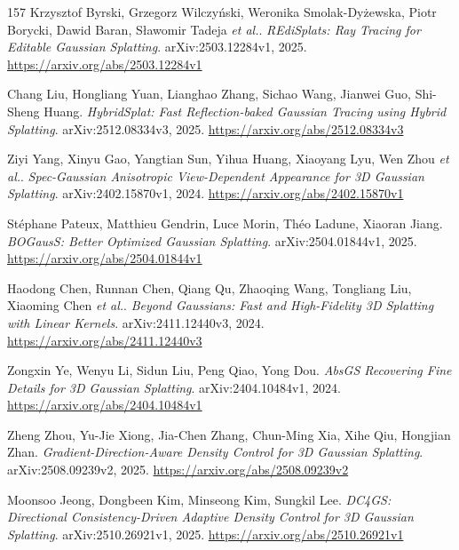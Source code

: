 \documentclass[11pt,a4paper]{article}
\begin{document}
\begin{thebibliography}{157}
Krzysztof Byrski, Grzegorz Wilczy\'{n}ski, Weronika Smolak-Dy\.{z}ewska, Piotr Borycki, Dawid Baran, S\l{}awomir Tadeja \emph{et al.}.
\newblock \emph{REdiSplats: Ray Tracing for Editable Gaussian Splatting}.
\newblock arXiv:2503.12284v1, 2025.
\newblock \url{https://arxiv.org/abs/2503.12284v1}

Chang Liu, Hongliang Yuan, Lianghao Zhang, Sichao Wang, Jianwei Guo, Shi-Sheng Huang.
\newblock \emph{HybridSplat: Fast Reflection-baked Gaussian Tracing using Hybrid Splatting}.
\newblock arXiv:2512.08334v3, 2025.
\newblock \url{https://arxiv.org/abs/2512.08334v3}

Ziyi Yang, Xinyu Gao, Yangtian Sun, Yihua Huang, Xiaoyang Lyu, Wen Zhou \emph{et al.}.
\newblock \emph{Spec-Gaussian Anisotropic View-Dependent Appearance for 3D Gaussian Splatting}.
\newblock arXiv:2402.15870v1, 2024.
\newblock \url{https://arxiv.org/abs/2402.15870v1}

St\'{e}phane Pateux, Matthieu Gendrin, Luce Morin, Th\'{e}o Ladune, Xiaoran Jiang.
\newblock \emph{BOGausS: Better Optimized Gaussian Splatting}.
\newblock arXiv:2504.01844v1, 2025.
\newblock \url{https://arxiv.org/abs/2504.01844v1}

Haodong Chen, Runnan Chen, Qiang Qu, Zhaoqing Wang, Tongliang Liu, Xiaoming Chen \emph{et al.}.
\newblock \emph{Beyond Gaussians: Fast and High-Fidelity 3D Splatting with Linear Kernels}.
\newblock arXiv:2411.12440v3, 2024.
\newblock \url{https://arxiv.org/abs/2411.12440v3}

Zongxin Ye, Wenyu Li, Sidun Liu, Peng Qiao, Yong Dou.
\newblock \emph{AbsGS Recovering Fine Details for 3D Gaussian Splatting}.
\newblock arXiv:2404.10484v1, 2024.
\newblock \url{https://arxiv.org/abs/2404.10484v1}

Zheng Zhou, Yu-Jie Xiong, Jia-Chen Zhang, Chun-Ming Xia, Xihe Qiu, Hongjian Zhan.
\newblock \emph{Gradient-Direction-Aware Density Control for 3D Gaussian Splatting}.
\newblock arXiv:2508.09239v2, 2025.
\newblock \url{https://arxiv.org/abs/2508.09239v2}

Moonsoo Jeong, Dongbeen Kim, Minseong Kim, Sungkil Lee.
\newblock \emph{DC4GS: Directional Consistency-Driven Adaptive Density Control for 3D Gaussian Splatting}.
\newblock arXiv:2510.26921v1, 2025.
\newblock \url{https://arxiv.org/abs/2510.26921v1}


\end{thebibliography}
\end{document}
